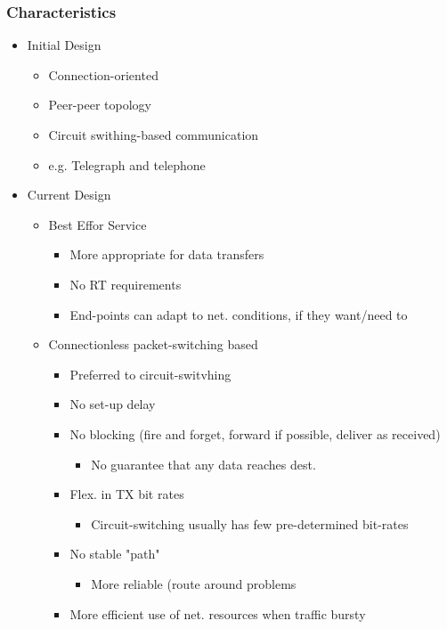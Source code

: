 \documentclass[a4paper]{article}
\begin{document}
\subsubsection{Characteristics}
\begin{itemize}
	\item Initial Design
	\begin{itemize}
		\item Connection-oriented
		\item Peer-peer topology
		\item Circuit swithing-based communication
		\item e.g. Telegraph and telephone
	\end{itemize}
	\item Current Design
	\begin{itemize}
		\item Best Effor Service
		\begin{itemize}
			\item More appropriate for data transfers
			\item No RT requirements
			\item End-points can adapt to net. conditions, if they
				want/need to
		\end{itemize}
		\item Connectionless packet-switching based
		\begin{itemize}
			\item Preferred to circuit-switvhing
			\item No set-up delay
			\item No blocking (fire and forget, forward if possible,
				deliver as received)
			\begin{itemize}
				\item No guarantee that any data reaches dest.
			\end{itemize}
			\item Flex. in TX bit rates
			\begin{itemize}
				\item Circuit-switching usually has few
					pre-determined bit-rates
			\end{itemize}
			\item No stable "path"
			\begin{itemize}
				\item More reliable (route around problems
			\end{itemize}
			\item More efficient use of net. resources when traffic
				bursty
		\end{itemize}
	\end{itemize}
\end{itemize}
\end{document}
